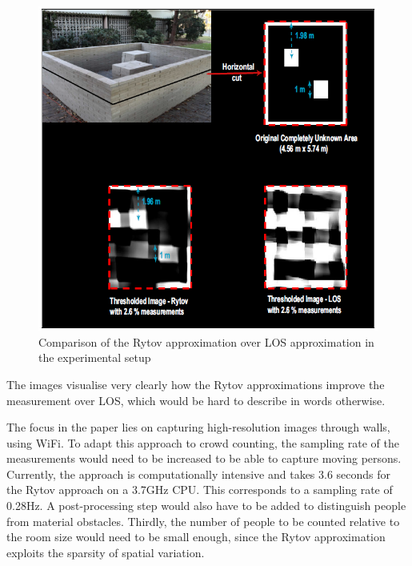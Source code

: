 \documentclass[conference]{IEEEtran}
\begin{document}
\begin{figure}[htbp]
\centerline{\includegraphics[scale=0.4]{figRytovVsLOS.PNG}}
\caption{Comparison of the Rytov approximation over LOS approximation in the experimental setup \cite{DepatlaMostofi2015}}
\label{figRytovLOS}
\end{figure}
The images visualise very clearly how the Rytov approximations improve the measurement over LOS, which would be hard to describe in words otherwise.
\par
The focus in the paper lies on capturing high-resolution images through walls, using WiFi. To adapt this approach to crowd counting, the sampling rate of the measurements would need to be increased to be able to capture moving persons. Currently, the approach is computationally intensive and takes 3.6 seconds for the Rytov approach on a 3.7GHz CPU. This corresponds to a sampling rate of 0.28Hz. A post-processing step would also have to be added to distinguish people from material obstacles. Thirdly, the number of people to be counted relative to the room size would need to be small enough, since the Rytov approximation exploits the sparsity of spatial variation.
\end{document}
